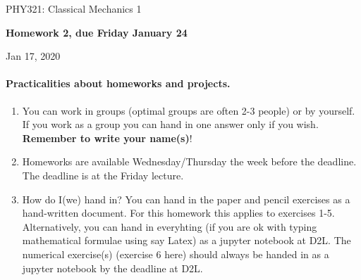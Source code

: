 \documentclass[%
oneside,                 %
final,                   %
10pt]{article}
\begin{document}

\newcommand{\exercisesection}[1]{\subsection*{#1}}






\thispagestyle{empty}

\begin{center}
{\LARGE\bf
\begin{spacing}{1.25}
PHY321: Classical Mechanics 1
\end{spacing}
}
\end{center}


\begin{center}
{\bf Homework 2, due Friday January 24${}^{}$} \\ [0mm]
\end{center}

\begin{center}
\end{center}
    

\begin{center}
Jan 17, 2020
\end{center}

\vspace{1cm}


\paragraph{Practicalities about  homeworks and projects.}
\begin{enumerate}
\item You can work in groups (optimal groups are often 2-3 people) or by yourself. If you work as a group you can hand in one answer only if you wish. \textbf{Remember to write your name(s)}!

\item Homeworks are available Wednesday/Thursday the week before the deadline. The deadline is at the Friday lecture.

\item How do I(we)  hand in?  You can hand in the paper and pencil exercises as a hand-written document. For this homework this applies to exercises 1-5. Alternatively, you can hand in everyhting (if you are ok with typing mathematical formulae using say Latex) as a jupyter notebook at D2L. The numerical exercise(s) (exercise 6 here) should always be handed in as a jupyter notebook by the deadline at D2L. 
\end{enumerate}
\end{document}
